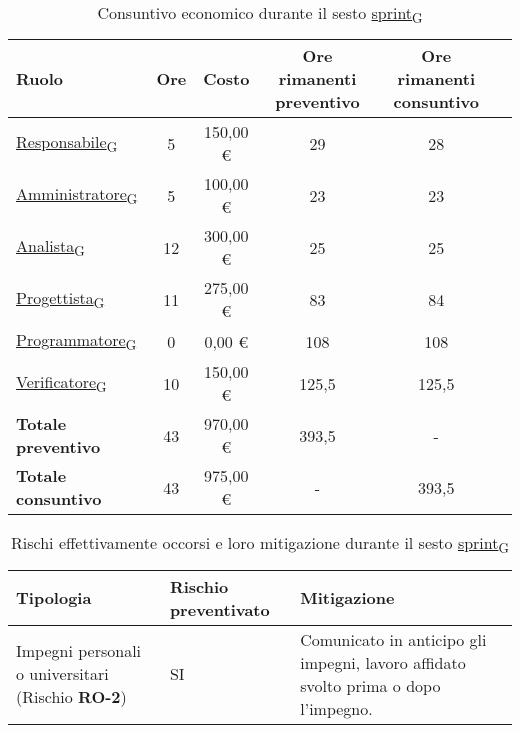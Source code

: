 \begin{table}[!h]
    \centering
    \begin{tabular}{ | l | c | c | c | c | c | }
        \hline
        \textbf{Ruolo} & \textbf{Ore} & \textbf{Costo} & \textbf{Ore rimanenti preventivo} & \textbf{Ore rimanenti consuntivo} \\
        \hline
        \href{https://7last.github.io/docs/rtb/documentazione-interna/glossario\#responsabile}{Responsabile\textsubscript{G}}			&  5   &    150,00 € &   29   &   28   \\
        \href{https://7last.github.io/docs/rtb/documentazione-interna/glossario\#amministratore}{Amministratore\textsubscript{G}}		&  5   &    100,00 € &   23   &   23   \\
        \href{https://7last.github.io/docs/rtb/documentazione-interna/glossario\#analista}{Analista\textsubscript{G}}                   &  12   &    300,00 € &   25   &   25   \\
        \href{https://7last.github.io/docs/rtb/documentazione-interna/glossario\#progettista}{Progettista\textsubscript{G}}                										  &  11   &    275,00 € &   83   &   84   \\
        \href{https://7last.github.io/docs/rtb/documentazione-interna/glossario\#programmatore}{Programmatore\textsubscript{G}}              										  &  0   &    0,00 € &   108   &   108   \\
        \href{https://7last.github.io/docs/rtb/documentazione-interna/glossario\#verificatore}{Verificatore\textsubscript{G}}               &  10   &    150,00 € &   125,5   &   125,5   \\
        \hline
        \textbf{Totale preventivo} &  43   &    970,00 € &   393,5   &   -   \\
        \hline
        \textbf{Totale consuntivo} &  43   &    975,00 € &   -   &   393,5   \\
        \hline
    \end{tabular}
    \caption{Consuntivo economico durante il sesto \href{https://7last.github.io/docs/rtb/documentazione-interna/glossario\#sprint}{sprint\textsubscript{G}}}

\end{table}
\newpage
{}
\begin{table}[!h]
    \centering
    \begin{tabular}{ | p{6cm} | p{2.5cm} | p{7.5cm} | }
        \hline
        \textbf{Tipologia} & \textbf{Rischio preventivato} & \textbf{Mitigazione}  \\
        \hline
        Impegni personali o universitari (Rischio \textbf{RO-2})& SI & Comunicato in anticipo gli impegni, lavoro affidato svolto prima o dopo l’impegno. \\
        \hline
    \end{tabular}
    \caption{Rischi effettivamente occorsi e loro mitigazione durante il sesto \href{https://7last.github.io/docs/rtb/documentazione-interna/glossario\#sprint}{sprint\textsubscript{G}}}
\end{table}

